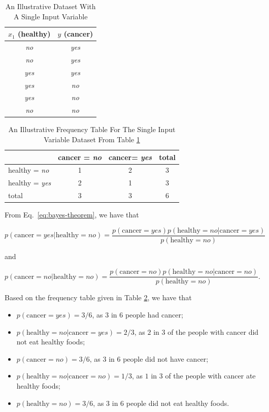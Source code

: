 \begin{table}[ht]
\centering
\caption{An Illustrative Dataset With A Single Input Variable} \label{tab:dataset-single-input}
\begin{tabular}{|c|c|} \hline
$x_1$ (healthy) & $y$ (cancer) \\ \hline
\textit{no} & \textit{yes} \\
\textit{no} & \textit{yes} \\
\textit{yes} & \textit{yes} \\
\textit{yes} & \textit{no} \\
\textit{yes} & \textit{no} \\
\textit{no} & \textit{no} \\ \hline
\end{tabular}
\end{table}

\begin{table}[ht]
\centering
\caption{An Illustrative Frequency Table For The Single Input Variable Dataset From Table \ref{tab:dataset-single-input}} \label{tab:frequency-single-input}
\begin{tabular}{|l|c|c|c|} \hline
 & cancer = \textit{no} & cancer= \textit{yes} & total \\ \hline
healthy = \textit{no} & 1 & 2 & 3 \\ \hline
healthy = \textit{yes} & 2 & 1 & 3 \\ \hline
total & 3 & 3 & 6 \\ \hline
\end{tabular}
\end{table}

From Eq.~\ref{eq:bayes-theorem}, we have that

\[ p(\text{cancer}=\textit{yes}|\text{healthy} = \textit{no}) = 
\frac{p(\text{cancer}=\textit{yes}) p(\text{healthy} = \textit{no}|\text{cancer}=\textit{yes})}{p(\text{healthy} = \textit{no})} \]

and

\[p(\text{cancer}=\textit{no}|\text{healthy} = \textit{no}) =
\frac{p(\text{cancer}=\textit{no}) p(\text{healthy} = \textit{no}|\text{cancer}=\textit{no})}{p(\text{healthy} = \textit{no})} .\]

\vspace{1cm}
Based on the frequency table given in Table \ref{tab:frequency-single-input}, we have that

\begin{itemize}
\item $p(\text{cancer}=\textit{yes}) = 3/6$, as $3$ in $6$ people had cancer;
\item $p(\text{healthy} = \textit{no}|\text{cancer}=\textit{yes}) = 2/3$, as $2$ in $3$ of the people with cancer did not eat healthy foods;
\item $p(\text{cancer}=\textit{no}) = 3/6$, as $3$ in $6$ people did not have cancer;
\item $p(\text{healthy} = \textit{no}|\text{cancer}=\textit{no}) = 1/3$, as $1$ in $3$ of the people with cancer ate healthy foods;
\item $p(\text{healthy} = \textit{no}) = 3/6$, as $3$ in $6$ people did not eat healthy foods.
\end{itemize}

